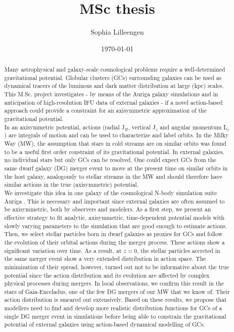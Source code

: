 \documentclass[a4paper,12pt,abstracton, twoside, headings=optiontohead]{scrartcl}
\title{MSc thesis}
\author{Sophia Lilleengen}
\date{\today}
\begin{document}
 

\renewcommand{\bibname}{Bibliography}



\newpage
\thispagestyle{empty}
\begin{abstract}
\hspace{-12pt}Many astrophysical and galaxy-scale cosmological problems require a well-determined gravitational potential. Globular clusters (GCs) surrounding galaxies can be used as dynamical tracers of the luminous and dark matter distribution at large (kpc) scales. This M.Sc. project investigates - by means of the Auriga galaxy simulations and in anticipation of high-resolution IFU data of external galaxies - if a novel action-based approach could provide a constraint for an axisymmetric approximation of the gravitational potential. \\
In an axisymmetric potential, actions (radial J$_R$, vertical J$_z$ and angular momentum L$_z$) are integrals of motion and can be used to characterize and label orbits. In the Milky Way (MW), the assumption that stars in cold streams are on similar orbits was found to be a useful first order constraint of its gravitational potential. In external galaxies, no individual stars but only GCs can be resolved. One could expect GCs from the same dwarf galaxy (DG) merger event to move at the present time on similar orbits in the host galaxy, analogously to stellar streams in the MW and should therefore have similar actions in the true (axisymmetric) potential. \\
We investigate this idea in one galaxy of the cosmological N-body simulation suite Auriga \citep{AurigaGrand}. This is necessary and important since external galaxies are often assumed to be axisymmetric, both by observers and modelers. As a first step, we present an effective strategy to fit analytic, axisymmetric, time-dependent potential models with slowly varying parameters to the simulation that are good enough to estimate actions. \\
Then, we select stellar particles born in dwarf galaxies as proxies for GCs and follow the evolution of their orbital actions during the merger process. These actions show a significant variation over time. As a result, at $z=0$, the stellar particles accreted in the same merger event show a very extended distribution in action space. The minimization of their spread, however, turned out not to be informative about the true potential since the action distribution and its evolution are affected by complex physical processes during mergers. In local observations, we confirm this result in the stars of Gaia-Enceladus, one of the few DG mergers of our MW that we know of. Their action distribution is smeared out extensively. Based on these results, we propose that modellers need to find and develop more realistic distribution functions for GCs of a single DG merger event in simulations before being able to constrain the gravitational potential of external galaxies using action-based dynamical modelling of GCs.

\end{abstract}
\end{document}
